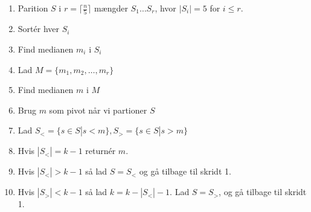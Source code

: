 \begin{frame}[allowframebreaks]
\begin{itemize}
		      \begin{enumerate}
			      \item Parition $S$ i $r = \lceil \frac{n}{5} \rceil$ mængder $S_{1} \ldots S_{r}$, hvor $|S_{i}| = 5$ for $i \le r$.
			      \item Sortér hver $S_{i}$
			      \item Find medianen $m_{i}$ i $S_{i}$
			      \item Lad $M = \{m_{1}, m_{2}, \ldots, m_{r}\}$
			      \item Find medianen $m$ i $M$
			      \item Brug $m$ som pivot når vi partioner $S$
			      \item Lad $S_{<} = \{s \in S | s < m\}, S_{>} = \{s \in S | s > m\}$
			      \item Hvis $|S_{<}| = k-1$ returnér $m$.
			      \item Hvis $|S_{<}| > k-1$ så lad $S = S_{<}$ og gå tilbage til skridt 1.
			      \item Hvis $|S_{>}| < k-1$ så lad $k = k-|S_{<}|-1$. Lad $S = S_{>}$, og gå tilbage til skridt 1.
		      \end{enumerate}
	\end{itemize}
\end{frame}

